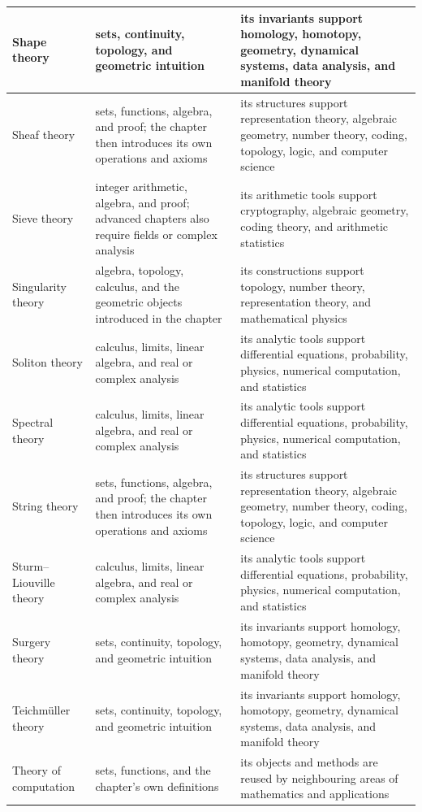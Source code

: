 \documentclass[11pt,oneside]{book}
\begin{document}
\begin{longtable}{>{\raggedright\arraybackslash}p{}>{\raggedright\arraybackslash}p{}>{\raggedright\arraybackslash}p{}}
\hline
Shape theory & sets, continuity, topology, and geometric intuition & its invariants support homology, homotopy, geometry, dynamical systems, data analysis, and manifold theory\\
\hline
Sheaf theory & sets, functions, algebra, and proof; the chapter then introduces its own operations and axioms & its structures support representation theory, algebraic geometry, number theory, coding, topology, logic, and computer science\\
\hline
Sieve theory & integer arithmetic, algebra, and proof; advanced chapters also require fields or complex analysis & its arithmetic tools support cryptography, algebraic geometry, coding theory, and arithmetic statistics\\
\hline
Singularity theory & algebra, topology, calculus, and the geometric objects introduced in the chapter & its constructions support topology, number theory, representation theory, and mathematical physics\\
\hline
Soliton theory & calculus, limits, linear algebra, and real or complex analysis & its analytic tools support differential equations, probability, physics, numerical computation, and statistics\\
\hline
Spectral theory & calculus, limits, linear algebra, and real or complex analysis & its analytic tools support differential equations, probability, physics, numerical computation, and statistics\\
\hline
String theory & sets, functions, algebra, and proof; the chapter then introduces its own operations and axioms & its structures support representation theory, algebraic geometry, number theory, coding, topology, logic, and computer science\\
\hline
Sturm--Liouville theory & calculus, limits, linear algebra, and real or complex analysis & its analytic tools support differential equations, probability, physics, numerical computation, and statistics\\
\hline
Surgery theory & sets, continuity, topology, and geometric intuition & its invariants support homology, homotopy, geometry, dynamical systems, data analysis, and manifold theory\\
\hline
Teichmüller theory & sets, continuity, topology, and geometric intuition & its invariants support homology, homotopy, geometry, dynamical systems, data analysis, and manifold theory\\
\hline
Theory of computation & sets, functions, and the chapter's own definitions & its objects and methods are reused by neighbouring areas of mathematics and applications\\

\end{longtable}
\end{document}
